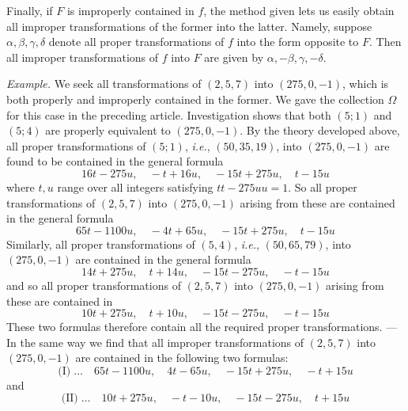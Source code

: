 Finally, if $F$ is improperly contained in $f$, the method given lets us easily obtain all improper transformations of the former into the latter. Namely, suppose $\alpha,\beta,\gamma,\delta$ denote all proper transformations of $f$ into the form opposite to $F$. Then all improper transformations of $f$ into $F$ are given by $\alpha,-\beta,\gamma,-\delta$.

\textit{Example.} We seek all transformations of $(2,5,7)$ into $(275,0,-1)$, which is both properly and improperly contained in the former. We gave the collection $\Omega$ for this case in the preceding article. Investigation shows that both $(5;1)$ and $(5;4)$ are properly equivalent to $(275,0,-1)$. By the theory developed above, all proper transformations of $(5;1)$, \textit{i.e.}, $(50,35,19)$, into $(275,0,-1)$ are found to be contained in the general formula
\[
16t-275u,\quad -t+16u,\quad -15t+275u,\quad t-15u
\]
where $t,u$ range over all integers satisfying $tt-275uu=1$.
So all proper transformations of $(2,5,7)$ into $(275,0,-1)$ arising from these are contained in the general formula
\[
65t-1100u,\quad -4t+65u,\quad -15t+275u,\quad t-15u
\]
Similarly, all proper transformations of $(5,4)$, \textit{i.e.}, $(50,65,79)$, into $(275,0,-1)$ are contained in the general formula
\[
14t+275u,\quad t+14u,\quad -15t-275u,\quad -t-15u
\]
and so all proper transformations of $(2,5,7)$ into $(275,0,-1)$ arising from these are contained in
\[
10t+275u,\quad t+10u,\quad -15t-275u,\quad -t-15u
\]
These two formulas therefore contain all the required proper transformations. --- In the same way we find that all improper transformations of $(2,5,7)$ into $(275,0,-1)$ are contained in the following two formulas:
\[
\text{(I)}\;\ldots\quad 65t-1100u,\quad 4t-65u,\quad -15t+275u,\quad -t+15u
\]
and
\[
\text{(II)}\;\ldots\quad 10t+275u,\quad -t-10u,\quad -15t-275u,\quad t+15u
\]

